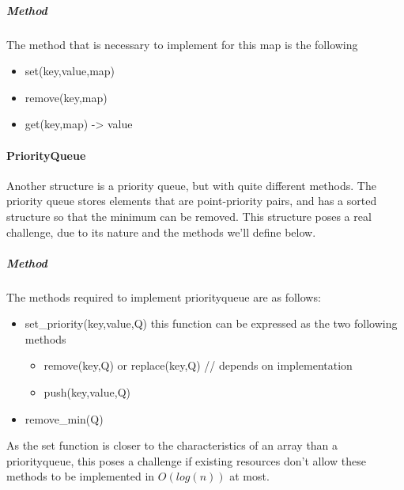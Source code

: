 \subparagraph{Method}

The method that is necessary to implement for this map is the following

\begin{itemize}
    \item set(key,value,map)
    \item remove(key,map)
    \item get(key,map) -> value
\end{itemize}


\paragraph{PriorityQueue}
Another structure is a priority queue, but with quite different methods.
The priority queue stores elements that are point-priority pairs, and has a sorted structure so that the minimum can be removed. This structure poses a real challenge, due to its nature and the methods we'll define below.


\subparagraph{Method}
The methods required to implement priorityqueue are as follows:
\begin{itemize}
    \item set\_priority(key,value,Q) this function can be expressed as the two following methods
    \begin{itemize}
        \item remove(key,Q) or replace(key,Q) // depends on implementation
        \item push(key,value,Q)
    \end{itemize}
    \item remove\_min(Q)
\end{itemize}

As the set function is closer to the characteristics of an array than a priorityqueue, this poses a challenge if existing resources don't allow these methods to be implemented in $O(log(n))$ at most.



